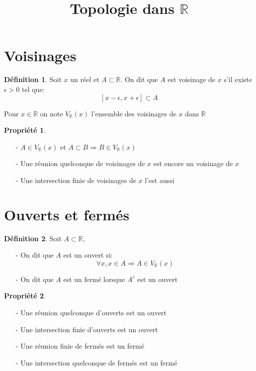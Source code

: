 \documentclass[fleqn]{article}
\title{Topologie dans $\mathbb{R}$}
\date{}
\theoremstyle{definition} \newtheorem*{defi}{D\'efinition}
\theoremstyle{definition} \newtheorem*{theo}{Th\'eor\`eme}
\theoremstyle{definition} \newtheorem*{adh}{Caract\'erisation s\'equentielle de l'adh\'erence}
\theoremstyle{definition} \newtheorem*{prop}{Propri\'et\'e}
\theoremstyle{definition} \newtheorem*{fermitude}{Caract\'erisation s\'equentielle de la fermitude}
\begin{document}
\maketitle

\section{Voisinages}
\begin{defi}
	Soit $x$ un r\'eel et $A \subset \mathbb{R}$. On dit que $A$ est voisinage de $x$ s'il existe $\epsilon > 0$ tel que:
	\[[x-\epsilon, x+\epsilon] \subset A\]
\end{defi}
Pour $x \in \mathbb{R}$ on note $V_\mathbb{R}(x)$ l'ensemble des voisinages de $x$ dans $\mathbb{R}$

\begin{prop} $ $
	\begin{itemize}
		\item [-] $A \in V_\mathbb{R}(x)$ et $A \subset B \Rightarrow B \in V_\mathbb{R}(x)$
		\item [-] Une r\'eunion quelconque de voisinages de $x$ est encore un voisinage de $x$
		\item [-] Une intersection finie de voisinages de $x$ l'est aussi
	\end{itemize}
\end{prop}

\section{Ouverts et ferm\'es}
\begin{defi}
	Soit $A \subset \mathbb{R}$,
	\begin{itemize}
		\item [-] On dit que $A$ est un ouvert si:
			\[\forall x, x \in A \Rightarrow A \in V_\mathbb{R}(x)\]
		\item [-] On dit que $A$ est un ferm\'e lorsque $A^c$ est un ouvert
	\end{itemize}
\end{defi}

\begin{prop} $ $
	\begin{itemize}
		\item [-] Une r\'eunion quelconque d'ouverts est un ouvert
		\item [-] Une intersection finie d'ouverts est un ouvert
		\item [-] Une r\'eunion finie de ferm\'es est un ferm\'e
		\item [-] Une intersection quelconque de ferm\'es est un ferm\'e
	\end{itemize}
\end{prop}
\end{document}
